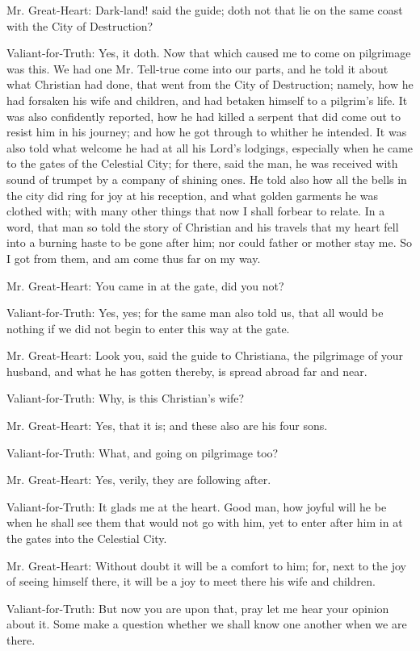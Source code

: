Mr. Great-Heart: Dark-land! said the guide; doth not that lie on the same coast with the City of Destruction?

Valiant-for-Truth: Yes, it doth. Now that which caused me to come on pilgrimage was this. We had one Mr. Tell-true come into our parts, and he told it about what Christian had done, that went from the City of Destruction; namely, how he had forsaken his wife and children, and had betaken himself to a pilgrim's life. It was also confidently reported, how he had killed a serpent that did come out to resist him in his journey; and how he got through to whither he intended. It was also told what welcome he had at all his Lord's lodgings, especially when he came to the gates of the Celestial City; for there, said the man, he was received with sound of trumpet by a company of shining ones. He told also how all the bells in the city did ring for joy at his reception, and what golden garments he was clothed with; with many other things that now I shall forbear to relate. In a word, that man so told the story of Christian and his travels that my heart fell into a burning haste to be gone after him; nor could father or mother stay me. So I got from them, and am come thus far on my way.

Mr. Great-Heart: You came in at the gate, did you not?

Valiant-for-Truth: Yes, yes; for the same man also told us, that all would be nothing if we did not begin to enter this way at the gate.

Mr. Great-Heart: Look you, said the guide to Christiana, the pilgrimage of your husband, and what he has gotten thereby, is spread abroad far and near.

Valiant-for-Truth: Why, is this Christian's wife?

Mr. Great-Heart: Yes, that it is; and these also are his four sons.

Valiant-for-Truth: What, and going on pilgrimage too?

Mr. Great-Heart: Yes, verily, they are following after.

Valiant-for-Truth: It glads me at the heart. Good man, how joyful will he be when he shall see them that would not go with him, yet to enter after him in at the gates into the Celestial City.

Mr. Great-Heart: Without doubt it will be a comfort to him; for, next to the joy of seeing himself there, it will be a joy to meet there his wife and children.

Valiant-for-Truth: But now you are upon that, pray let me hear your opinion about it. Some make a question whether we shall know one another when we are there.

